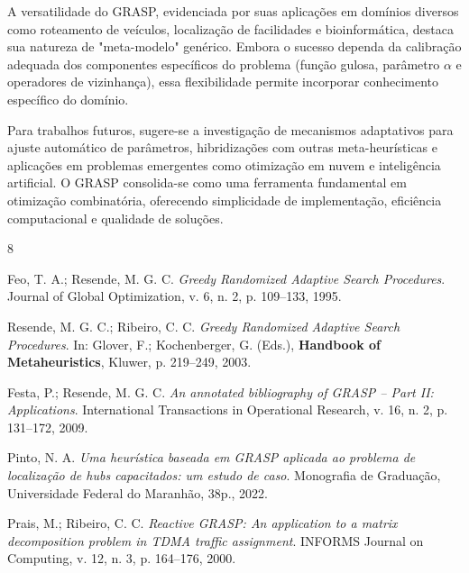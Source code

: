 \documentclass[a4paper, 12pt]{article}
\begin{document}
A versatilidade do GRASP, evidenciada por suas aplicações em domínios diversos como roteamento de veículos, localização de facilidades e bioinformática, destaca sua natureza de "meta-modelo" genérico. Embora o sucesso dependa da calibração adequada dos componentes específicos do problema (função gulosa, parâmetro $\alpha$ e operadores de vizinhança), essa flexibilidade permite incorporar conhecimento específico do domínio.

Para trabalhos futuros, sugere-se a investigação de mecanismos adaptativos para ajuste automático de parâmetros, hibridizações com outras meta-heurísticas e aplicações em problemas emergentes como otimização em nuvem e inteligência artificial. O GRASP consolida-se como uma ferramenta fundamental em otimização combinatória, oferecendo simplicidade de implementação, eficiência computacional e qualidade de soluções.

\begin{thebibliography}{8}

    Feo, T. A.; Resende, M. G. C.
    \emph{Greedy Randomized Adaptive Search Procedures}.
    Journal of Global Optimization, v. 6, n. 2, p. 109--133, 1995.

    Resende, M. G. C.; Ribeiro, C. C.
    \emph{Greedy Randomized Adaptive Search Procedures}.
    In: Glover, F.; Kochenberger, G. (Eds.), \textbf{Handbook of Metaheuristics}, Kluwer, p. 219--249, 2003.

    Festa, P.; Resende, M. G. C.
    \emph{An annotated bibliography of GRASP -- Part II: Applications}.
    International Transactions in Operational Research, v. 16, n. 2, p. 131--172, 2009.

    Pinto, N. A.
    \emph{Uma heurística baseada em GRASP aplicada ao problema de localização de hubs capacitados: um estudo de caso}.
    Monografia de Graduação, Universidade Federal do Maranhão, 38p., 2022.

    Prais, M.; Ribeiro, C. C.
    \emph{Reactive GRASP: An application to a matrix decomposition problem in TDMA traffic assignment}.
    INFORMS Journal on Computing, v. 12, n. 3, p. 164--176, 2000.

\end{thebibliography}
\end{document}
